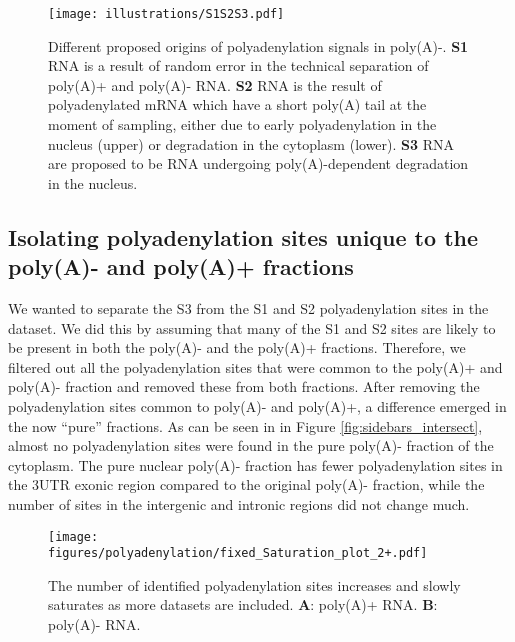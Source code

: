 \begin{figure}[hb]
	\begin{center}
		\texttt{[image: illustrations/S1S2S3.pdf]}
	\end{center}
    \caption{Different proposed origins of polyadenylation signals in poly(A)-.
    \textbf{S1} RNA is a result of random error in the technical separation of
    poly(A)+ and poly(A)- RNA. \textbf{S2} RNA is the result of polyadenylated
    mRNA which have a short poly(A) tail at the moment of sampling, either due
    to early polyadenylation in the nucleus (upper) or degradation in the
    cytoplasm (lower). \textbf{S3} RNA are proposed to be RNA undergoing
	poly(A)-dependent degradation in the nucleus.}
	\label{fig:S123}
\end{figure}

\subsection{Isolating polyadenylation sites unique to the poly(A)- and poly(A)+
fractions}
We wanted to separate the S3 from the S1 and S2 polyadenylation sites in the
dataset.  We did this by assuming that many of the S1 and S2 sites are likely
to be present in both the poly(A)- and the poly(A)+ fractions. Therefore, we
filtered out all the polyadenylation sites that were common to the poly(A)+ and
poly(A)- fraction and removed these from both fractions. After removing the
polyadenylation sites common to poly(A)- and poly(A)+, a difference emerged in
the now ``pure'' fractions. As can be seen in in Figure
\ref{fig:sidebars_intersect}, almost no polyadenylation sites were found in the
pure poly(A)- fraction of the cytoplasm. The pure nuclear poly(A)- fraction has
fewer polyadenylation sites in the 3\ppp UTR exonic region compared to the
original poly(A)- fraction, while the number of sites in the intergenic and
intronic regions did not change much.

\begin{figure}[hb]
	\begin{center}
		\texttt{[image: figures/polyadenylation/fixed\_Saturation\_plot\_2+.pdf]}
	\end{center}
	\caption{The number of identified polyadenylation sites increases and
	slowly saturates as more datasets are included. \textbf{A}: poly(A)+
	RNA. \textbf{B}: poly(A)- RNA.}
	\label{fig:saturation}
\end{figure}

